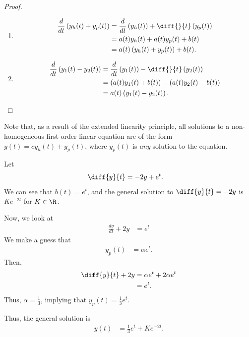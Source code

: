 \documentclass[10pt]{mypackage}
\begin{document}
\begin{proof}\hfill
  \begin{enumerate}[(1)]
    \item 
      \begin{align*}
        \frac{d}{dt}\left(y_h(t) + y_p(t)\right) &= \frac{d}{dt}\left(y_h(t)\right) + \diff{}{t}\left(y_p(t)\right)\\
                                                 &= a(t)y_h(t) + a(t)y_p(t) + b(t)\\
                                                 &= a(t)\left(y_h(t) + y_p(t)\right) + b(t).
      \end{align*}
    \item 
      \begin{align*}
        \frac{d}{dt}\left(y_1(t) - y_2(t)\right) &= \frac{d}{dt}\left(y_1(t)\right) - \diff{}{t}\left(y_2(t)\right)\\
                                                 &= \left(a(t)y_1(t) + b(t)\right) - \left(a(t)y_2(t) - b(t)\right)\\
                                                 &= a(t)\left(y_1(t)-y_2(t)\right).
      \end{align*}
  \end{enumerate}
\end{proof}
Note that, as a result of the extended linearity principle, all solutions to a non-homogeneous first-order linear equation are of the form $y(t) = cy_h(t) + y_{p}(t)$, where $y_{p}(t)$ is \textit{any} solution to the equation.
\begin{example}
  Let
  \begin{align*}
    \diff{y}{t} &= -2y + e^{t}.
  \end{align*}
  We can see that $b(t) = e^{t}$, and the general solution to $\diff{y}{t} = -2y$ is $Ke^{-2t}$ for $K\in \R$.\newline

  Now, we look at
  \begin{align*}
    \frac{dy}{dt} + 2y &= e^{t}
  \end{align*}
  We make a guess that
  \begin{align*}
    y_p(t) &= \alpha e^{t}.
  \end{align*}
  Then,
  \begin{align*}
    \diff{y}{t} + 2y &= \alpha e^{t} + 2\alpha e^{t}\\
                     &= e^{t}.
  \end{align*}
  Thus, $\alpha = \frac{1}{3}$, implying that $y_p(t) = \frac{1}{3}e^{t}$.\newline

  Thus, the general solution is
  \begin{align*}
    y(t) &= \frac{1}{3}e^{t} + Ke^{-2t}.
  \end{align*}
\end{example}
\end{document}

